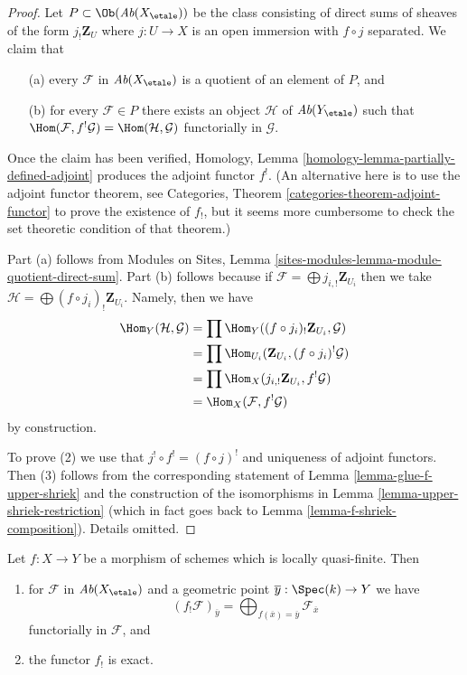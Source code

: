 \begin{proof}
Let $P \subset \Ob(\textit{Ab}(X_\etale))$ be the class consisting
of direct sums of sheaves of the form $j_!\mathbf{Z}_U$ where
$j : U \to X$ is an open immersion with $f \circ j$ separated.
We claim that
\begin{enumerate}
\item[(a)] every $\mathcal{F}$ in $\textit{Ab}(X_\etale)$ is a quotient
of an element of $P$, and
\item[(b)] for every $\mathcal{F} \in P$ there exists an object
$\mathcal{H}$ of $\textit{Ab}(Y_\etale)$ such that
$\Hom(\mathcal{F}, f^!\mathcal{G}) = \Hom(\mathcal{H}, \mathcal{G})$
functorially in $\mathcal{G}$.
\end{enumerate}
Once the claim has been verified,
Homology, Lemma \ref{homology-lemma-partially-defined-adjoint}
produces the adjoint functor $f^!$.
(An alternative here is to use the adjoint functor theorem, see
Categories, Theorem \ref{categories-theorem-adjoint-functor}
to prove the existence of $f_!$, but it seems more cumbersome
to check the set theoretic condition of that theorem.)

\medskip\noindent
Part (a) follows from Modules on Sites, Lemma
\ref{sites-modules-lemma-module-quotient-direct-sum}.
Part (b) follows because if
$\mathcal{F} = \bigoplus j_{i, !}\mathbf{Z}_{U_i}$
then we take $\mathcal{H} = \bigoplus (f \circ j_i)_!\mathbf{Z}_{U_i}$.
Namely, then we have
\begin{align*}
\Hom_Y(\mathcal{H}, \mathcal{G})
& =
\prod \Hom_Y((f \circ j_i)_!\mathbf{Z}_{U_i}, \mathcal{G}) \\
& =
\prod \Hom_{U_i}(\mathbf{Z}_{U_i}, (f \circ j_i)^!\mathcal{G}) \\
& =
\prod \Hom_X(j_{i, !}\mathbf{Z}_{U_i}, f^!\mathcal{G}) \\
& =
\Hom_X(\mathcal{F}, f^!\mathcal{G})
\end{align*}
by construction.

\medskip\noindent
To prove (2) we use that $j^! \circ f^! = (f \circ j)^!$ and uniqueness
of adjoint functors. Then (3) follows from the corresponding
statement of Lemma \ref{lemma-glue-f-upper-shriek} and the construction of
the isomorphisms in Lemma \ref{lemma-upper-shriek-restriction}
(which in fact goes back to Lemma \ref{lemma-f-shriek-composition}).
Details omitted.
\end{proof}

\begin{lemma}
\label{lemma-lqf-f-shriek-stalk}
Let $f : X \to Y$ be a morphism of schemes which is locally quasi-finite. Then
\begin{enumerate}
\item for $\mathcal{F}$ in $\textit{Ab}(X_\etale)$ and a geometric
point $\overline{y} : \Spec(k) \to Y$ we have
$$
(f_!\mathcal{F})_{\overline{y}} =
\bigoplus\nolimits_{f(\overline{x}) = \overline{y}} \mathcal{F}_{\overline{x}}
$$
functorially in $\mathcal{F}$, and
\item the functor $f_!$ is exact.
\end{enumerate}
\end{lemma}

